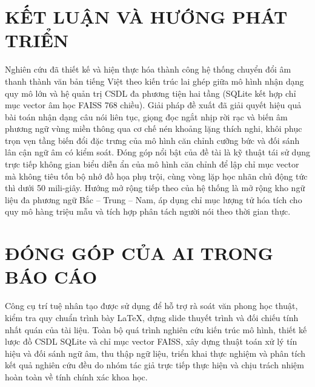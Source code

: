 \documentclass[12pt,a4paper]{article}
\begin{document}
\section{KẾT LUẬN VÀ HƯỚNG PHÁT TRIỂN}
Nghiên cứu đã thiết kế và hiện thực hóa thành công hệ thống chuyển đổi âm thanh thành văn bản tiếng Việt theo kiến trúc lai ghép giữa mô hình nhận dạng quy mô lớn và hệ quản trị CSDL đa phương tiện hai tầng (SQLite kết hợp chỉ mục vector âm học FAISS 768 chiều). Giải pháp đề xuất đã giải quyết hiệu quả bài toán nhận dạng câu nói liên tục, giọng đọc ngắt nhịp rời rạc và biến âm phương ngữ vùng miền thông qua cơ chế nén khoảng lặng thích nghi, khôi phục trọn vẹn tầng biến đổi đặc trưng của mô hình căn chỉnh cưỡng bức và đối sánh lân cận ngữ âm có kiểm soát. Đóng góp nổi bật của đề tài là kỹ thuật tái sử dụng trực tiếp không gian biểu diễn ẩn của mô hình căn chỉnh để lập chỉ mục vector mà không tiêu tốn bộ nhớ đồ họa phụ trội, cùng vòng lặp học nhãn chủ động tức thì dưới 50 mili-giây. Hướng mở rộng tiếp theo của hệ thống là mở rộng kho ngữ liệu đa phương ngữ Bắc -- Trung -- Nam, áp dụng chỉ mục lượng tử hóa tích cho quy mô hàng triệu mẫu và tích hợp phân tách người nói theo thời gian thực.

\renewcommand{\refname}{TÀI LIỆU THAM KHẢO}



\vspace{-6pt}
\section*{ĐÓNG GÓP CỦA AI TRONG BÁO CÁO}

Công cụ trí tuệ nhân tạo được sử dụng để hỗ trợ rà soát văn phong học thuật, kiểm tra quy chuẩn trình bày LaTeX, dựng slide thuyết trình và đối chiếu tính nhất quán của tài liệu. Toàn bộ quá trình nghiên cứu kiến trúc mô hình, thiết kế lược đồ CSDL SQLite và chỉ mục vector FAISS, xây dựng thuật toán xử lý tín hiệu và đối sánh ngữ âm, thu thập ngữ liệu, triển khai thực nghiệm và phân tích kết quả nghiên cứu đều do nhóm tác giả trực tiếp thực hiện và chịu trách nhiệm hoàn toàn về tính chính xác khoa học.
\end{document}
